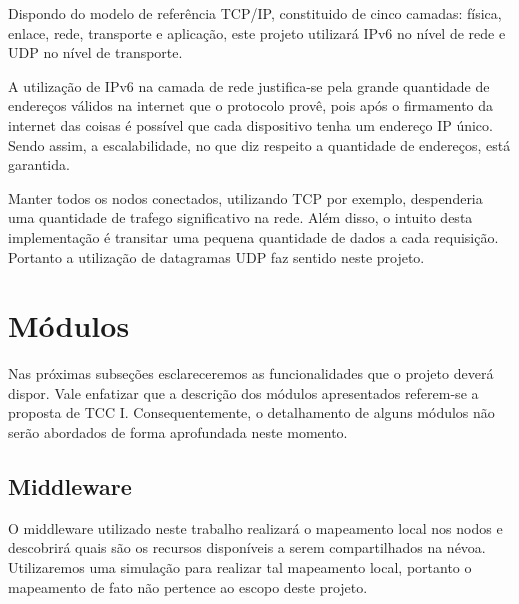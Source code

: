 Dispondo do modelo de referência TCP/IP\cite{tanenbaum2011redes}, constituido de cinco camadas: física, enlace, rede, transporte e aplicação, este projeto utilizará IPv6 no nível de rede e UDP no nível de transporte.

A utilização de IPv6 na camada de rede justifica-se pela grande quantidade de endereços válidos na internet que o protocolo provê, pois após o firmamento da internet das coisas é possível que cada dispositivo tenha um endereço IP único.
Sendo assim, a escalabilidade, no que diz respeito a quantidade de endereços, está garantida.

Manter todos os nodos conectados, utilizando TCP por exemplo, despenderia uma quantidade de trafego significativo na rede. Além disso, o intuito desta implementação é transitar uma pequena quantidade de dados a cada requisição.
Portanto a utilização de datagramas UDP faz sentido neste projeto.


\section{Módulos}

Nas próximas subseções esclareceremos as funcionalidades que o projeto deverá dispor.
Vale enfatizar que a descrição dos módulos apresentados referem-se a proposta de TCC I.
Consequentemente, o detalhamento de alguns módulos não serão abordados de forma aprofundada neste momento.


\subsection{Middleware}

O middleware utilizado neste trabalho realizará o mapeamento local nos nodos e descobrirá quais são os recursos disponíveis a serem compartilhados na névoa.
Utilizaremos uma simulação para realizar tal mapeamento local, portanto o mapeamento de fato não pertence ao escopo deste projeto.



